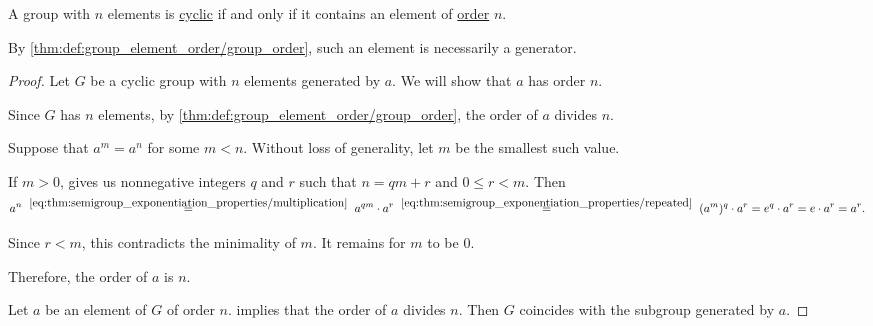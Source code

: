 \begin{lemma}\label{thm:cyclic_group_generator_order}
  A group with \( n \) elements is \hyperref[def:cyclic_group]{cyclic} if and only if it contains an element of \hyperref[def:group_element_order]{order} \( n \).
\end{lemma}
\begin{comments}
  \item By \cref{thm:def:group_element_order/group_order}, such an element is necessarily a generator.
\end{comments}
\begin{proof}
  \SufficiencySubProof Let \( G \) be a cyclic group with \( n \) elements generated by \( a \). We will show that \( a \) has order \( n \).

  Since \( G \) has \( n \) elements, by \cref{thm:def:group_element_order/group_order}, the order of \( a \) divides \( n \).

  Suppose that \( a^m = a^n \) for some \( m < n \). Without loss of generality, let \( m \) be the smallest such value.

  If \( m > 0 \),  gives us nonnegative integers \( q \) and \( r \) such that \( n = qm + r \) and \( 0 \leq r < m \). Then
  \begin{equation*}
    a^n
    \reloset {\eqref{eq:thm:semigroup_exponentiation_properties/multiplication}} =
    a^{qm} \cdot a^r
    \reloset {\eqref{eq:thm:semigroup_exponentiation_properties/repeated}} =
    (a^m)^q \cdot a^r
    =
    e^q \cdot a^r
    =
    e \cdot a^r
    =
    a^r.
  \end{equation*}

  Since \( r < m \), this contradicts the minimality of \( m \). It remains for \( m \) to be \( 0 \).

  Therefore, the order of \( a \) is \( n \).

  \NecessitySubProof Let \( a \) be an element of \( G \) of order \( n \).  implies that the order of \( a \) divides \( n \). Then \( G \) coincides with the subgroup generated by \( a \).
\end{proof}

